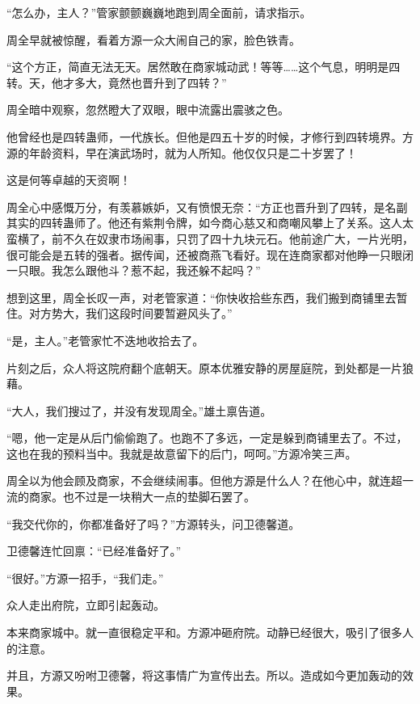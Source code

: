 
\begin{this_body}



“怎么办，主人？”管家颤颤巍巍地跑到周全面前，请求指示。

周全早就被惊醒，看着方源一众大闹自己的家，脸色铁青。

“这个方正，简直无法无天。居然敢在商家城动武！等等……这个气息，明明是四转。天，他才多大，竟然也晋升到了四转？”

周全暗中观察，忽然瞪大了双眼，眼中流露出震骇之色。

他曾经也是四转蛊师，一代族长。但他是四五十岁的时候，才修行到四转境界。方源的年龄资料，早在演武场时，就为人所知。他仅仅只是二十岁罢了！

这是何等卓越的天资啊！

周全心中感慨万分，有羡慕嫉妒，又有愤恨无奈：“方正也晋升到了四转，是名副其实的四转蛊师了。他还有紫荆令牌，如今商心慈又和商嘲风攀上了关系。这人太蛮横了，前不久在奴隶市场闹事，只罚了四十九块元石。他前途广大，一片光明，很可能会是五转的强者。据传闻，还被商燕飞看好。现在连商家都对他睁一只眼闭一只眼。我怎么跟他斗？惹不起，我还躲不起吗？”

想到这里，周全长叹一声，对老管家道：“你快收拾些东西，我们搬到商铺里去暂住。对方势大，我们这段时间要暂避风头了。”

“是，主人。”老管家忙不迭地收拾去了。

片刻之后，众人将这院府翻个底朝天。原本优雅安静的房屋庭院，到处都是一片狼藉。

“大人，我们搜过了，并没有发现周全。”雄土禀告道。

“嗯，他一定是从后门偷偷跑了。也跑不了多远，一定是躲到商铺里去了。不过，这也在我的预料当中。我就是故意留下的后门，呵呵。”方源冷笑三声。

周全以为他会顾及商家，不会继续闹事。但他方源是什么人？在他心中，就连超一流的商家。也不过是一块稍大一点的垫脚石罢了。

“我交代你的，你都准备好了吗？”方源转头，问卫德馨道。

卫德馨连忙回禀：“已经准备好了。”

“很好。”方源一招手，“我们走。”

众人走出府院，立即引起轰动。

本来商家城中。就一直很稳定平和。方源冲砸府院。动静已经很大，吸引了很多人的注意。

并且，方源又吩咐卫德馨，将这事情广为宣传出去。所以。造成如今更加轰动的效果。


\end{this_body}
